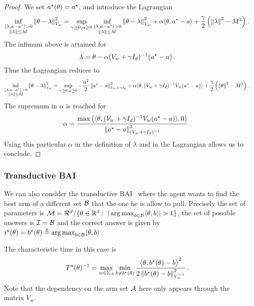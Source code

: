 \begin{proof}
We set $a^\star(\theta) = a^\star$, and introduce the Lagrangian
\[
 \inf_{\substack{\langle \lambda,a-a^\star \rangle>0\\ \left\lVert\lambda\right\rVert\leq M}} \left\lVert\theta -\lambda \right\rVert_{V_w}^2 = \sup_{\gamma\geq 0, \alpha\geq 0} \inf_{\substack{\langle \lambda,a-a^\star\rangle>0\\ \left\lVert\lambda\right\rVert\leq M}} \left\lVert\theta -\lambda \right\rVert_{V_w}^2 +\alpha \langle \theta, a^\star-a\rangle + \frac{\gamma}{2}\left(\left\lVert\lambda\right\rVert^2-M^2 \right)\,.
\]
The infimum above is attained for
\[
\lambda = \theta - \alpha (V_w + \gamma I_d)^{-1}(a^\star-a)\,.
\]
Thus the Lagrangian reduces to
\[
\inf_{\substack{\langle \lambda,a-a^\star \rangle>0\\ \left\lVert\lambda\right\rVert\leq M}} \left\lVert\theta -\lambda \right\rVert_{V_w}^2 = \sup_{\gamma\geq 0, \alpha\geq 0}
-\frac{\alpha^2}{2} \left\lVert a^\star-a\right\rVert^2_{V_w+\gamma I_d} + \alpha \langle \theta, (V_w+\gamma I_d)^{-1}V_w (a^\star-a)\rangle +\frac{\gamma}{2}\left(\left\lVert\theta\right\rVert^2-M^2 \right)\,.
\]
The supremum in $\alpha$ is reached for
\[
\alpha =\frac{\max\left(\langle \theta, (V_w+\gamma I_d)^{-1} V_w (a^\star-a)\rangle,0\right)}{\left\lVert a^\star-a\right\rVert^2_{(V_w+\gamma I_d)^{-1}}}\,.
\]
Using this particular $\alpha$ in the definition of $\lambda$ and in the Lagrangian allows us to conclude.
\end{proof}

\subsubsection{Transductive BAI}

We can also consider the transductive BAI~\citep{fiez2019transductive} where the agent wants to find the best arm of a different set $\mathcal{B}$ that the one he is allow to pull. Precisely the set of parameters is $\cM=\cR^d/\{\theta\in\R^d:\  |\argmax_{b\in\cB} \langle\theta,b\rangle|>1\}$, the set of possible answers is $\mathcal{I} = \mathcal{B}$ and the correct answer is given by $i^\star(\theta)=b^\star(\theta)\triangleq \operatorname*{arg\,max}_{b\in\mathcal{B}} \langle\theta,b\rangle$.

The characteristic time in this case is
\[
T^{\star}(\theta)^{-1} = \max_{w\in\Sigma_A} \min_{b\neq b^\star(\theta)} \frac{\big\langle \theta, b^\star(\theta)-b\big\rangle^2}{2 \left\lVert b^\star(\theta)-b\right\rVert_{V_w^{-1}}^2}\,.
\]
Note that the dependency on the arm set $\mathcal{A}$ here only appears through the matrix $V_w$.


